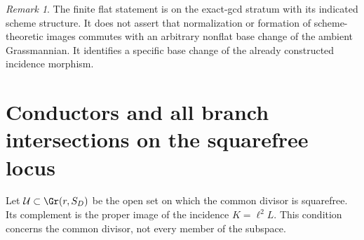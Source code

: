 \documentclass[11pt,reqno]{amsart}
\numberwithin{equation}{section}
\theoremstyle{definition}\newtheorem{definition}[theorem]{Definition}
\theoremstyle{remark}\newtheorem{remark}[theorem]{Remark}
\begin{document}
\begin{remark}
The finite flat statement is on the exact-gcd stratum with its indicated
scheme structure. It does not assert that normalization or formation of
scheme-theoretic images commutes with an arbitrary nonflat base change
of the ambient Grassmannian. It identifies a specific base change of
the already constructed incidence morphism.
\end{remark}

\section{Conductors and all branch intersections on the squarefree locus}
\label{sec:squarefree-v153}
Let $\mathcal U\subset\Gr(r,S_D)$ be the open set on which the common
divisor is squarefree. Its complement is the proper image of the
incidence $K=\ell^2L$. This condition concerns the common divisor,
not every member of the subspace.
\end{document}
